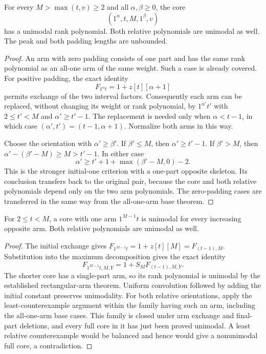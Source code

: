 \begin{corollary}
For every $M>\max(t,v)\ge2$ and all $\alpha,\beta\ge0$, the
core
\[
 (1^\alpha,t,M,1^\beta,v)
\]
has a unimodal rank polynomial. Both relative polynomials are
unimodal as well. The peak and both padding lengths are unbounded.
\end{corollary}
\begin{proof}
An arm with zero padding consists of one part and has the same
rank polynomial as an all-one arm of the same weight. Such a case
is already covered. For positive padding, the exact identity
\[
 F_{1^\alpha t}=1+z[t][\alpha+1]
\]
permits exchange of the two interval factors. Consequently each
arm can be replaced, without changing its weight or rank polynomial,
by $1^{\alpha'}t'$ with $2\le t'<M$ and $\alpha'\ge t'-1$.
The replacement is needed only when $\alpha<t-1$, in which case
$(\alpha',t')=(t-1,\alpha+1)$. Normalize both arms in this way.

Choose the orientation with $\alpha'\ge\beta'$. If $\beta'\le M$,
then $\alpha'\ge t'-1$. If $\beta'>M$, then
$\alpha'-(\beta'-M)\ge M>t'-1$. In either case
\[
 \alpha'\ge t'+1+\max(\beta'-M,0)-2.
\]
This is the stronger initial-one criterion with a one-part opposite
skeleton. Its conclusion transfers back to the original pair,
because the core and both relative polynomials depend only on the
two arm polynomials. The zero-padding cases are transferred in
the same way from the all-one-arm base theorem.
\end{proof}

\begin{corollary}
For $2\le t<M$, a core with one arm $1^{M-1}t$ is unimodal
for every increasing opposite arm. Both relative polynomials
are unimodal as well.
\end{corollary}
\begin{proof}
The initial exchange gives
$F_{1^{M-1}t}=1+z[t][M]=F_{(t-1),M}$. Substitution into the
maximum decomposition gives the exact identity
\[
 F_{1^{M-1}t,M,Y}=1+S_M F_{(t-1),M,Y}.
\]
The shorter core has a single-part arm, so its rank polynomial
is unimodal by the established rectangular-arm theorem.
Uniform convolution followed by adding the initial constant
preserves unimodality. For both relative orientations, apply the
least-counterexample argument within the family having such an
arm, including the all-one-arm base cases. This family is closed
under arm exchange and final-part deletions, and every full core
in it has just been proved unimodal. A least relative counterexample
would be balanced and hence would give a nonunimodal full core,
a contradiction.
\end{proof}

